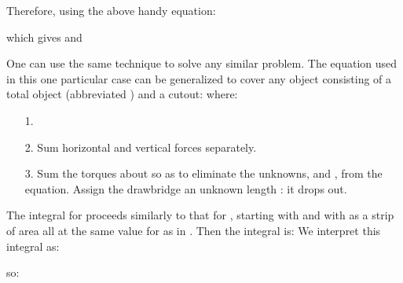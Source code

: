 {{Therefore, using the above handy equation:
%
%

which gives
%
%
and
%

One can use the same technique to solve any similar problem.
The equation used in this one particular case can be generalized to cover
any object consisting of a total object (abbreviated ) and a 
cutout:
%
%
where:

{\begin{itemize}
 \item [1.] 

 \item [2.] Sum horizontal and vertical forces separately.
 \item [3.] Sum the torques about  so as to eliminate the unknowns,  and
            \m{\phi}, from the equation.
            Assign the drawbridge an unknown length \m{\ell}: it drops out.
 \end{itemize}
}

{The integral for  proceeds similarly to that for , starting with
 and with  as a strip of area all at the same value for  as in .
 Then the integral is:
 We interpret this integral as: 

  so:
}

}%
}%

